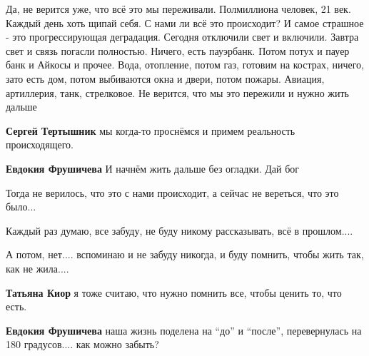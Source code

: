  
 
 
 
 

\qqSecCmt


Да, не верится уже, что всё это мы переживали. Полмиллиона человек, 21 век.
Каждый день хоть щипай себя. С нами ли всё это происходит? И самое страшное -
это прогрессирующая деградация. Сегодня отключили свет и включили. Завтра свет
и связь погасли полностью. Ничего, есть пауэрбанк. Потом потух и пауер банк и
Айкосы и прочее. Вода, отопление, потом газ, готовим на кострах, ничего, зато
есть дом, потом выбиваются окна и двери, потом пожары. Авиация, артиллерия,
танк, стрелковое. Не верится, что мы это пережили и нужно жить дальше

\begin{itemize} %
\textbf{Сергей Тертышник} мы когда-то проснёмся и примем реальность происходящего.

\textbf{Евдокия Фрушичева} И начнём жить дальше без огладки. Дай бог
\end{itemize} %


Тогда не верилось, что это с нами происходит, а сейчас не вереться, что это
было...

Каждый раз думаю, все забуду, не буду никому рассказывать, всё в прошлом....

А потом, нет.... вспоминаю и не забуду никогда, и буду помнить, чтобы жить так,
как не жила....

\begin{itemize} %
\textbf{Татьяна Киор} я тоже считаю, что нужно помнить все, чтобы ценить то, что есть.

\textbf{Евдокия Фрушичева} наша жизнь поделена на \enquote{до} и \enquote{после}, перевернулась на 180 градусов.... как можно забыть?
\end{itemize} %
